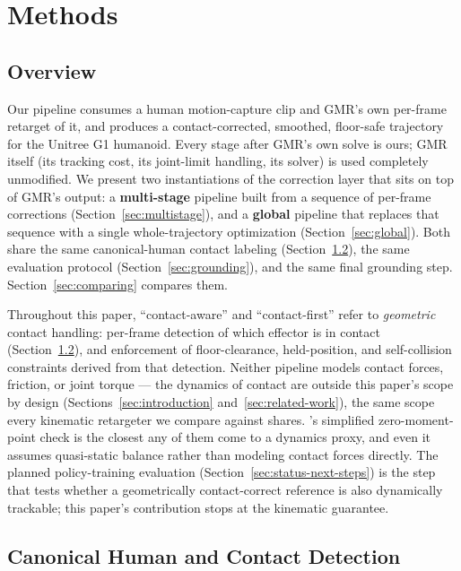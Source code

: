 \section{Methods}
\label{sec:methods}

\subsection{Overview}
\label{sec:overview}

Our pipeline consumes a human motion-capture clip and GMR's own per-frame
retarget of it, and produces a contact-corrected, smoothed, floor-safe
trajectory for the Unitree G1 humanoid. Every stage after GMR's own solve is
ours; GMR itself (its tracking cost, its joint-limit handling, its solver)
is used completely unmodified. We present two instantiations of the
correction layer that sits on top of GMR's output: a \textbf{multi-stage}
pipeline built from a sequence of per-frame corrections
(Section~\ref{sec:multistage}), and a \textbf{global} pipeline that replaces
that sequence with a single whole-trajectory optimization
(Section~\ref{sec:global}). Both share the same canonical-human contact
labeling (Section~\ref{sec:canonical}), the same evaluation protocol
(Section~\ref{sec:grounding}), and the same final grounding step.
Section~\ref{sec:comparing} compares them.

Throughout this paper, ``contact-aware'' and ``contact-first'' refer to
\textit{geometric} contact handling: per-frame detection of which effector
is in contact (Section~\ref{sec:canonical}), and enforcement of
floor-clearance, held-position, and self-collision constraints derived from
that detection. Neither pipeline models contact forces, friction, or joint
torque --- the dynamics of contact are outside this paper's scope by design
(Sections~\ref{sec:introduction} and~\ref{sec:related-work}), the same
scope every kinematic retargeter we compare against shares.
\cite{ayusawa2017morphing}'s simplified zero-moment-point check is the
closest any of them come to a dynamics proxy, and even it assumes
quasi-static balance rather than modeling contact forces directly. The
planned policy-training evaluation (Section~\ref{sec:status-next-steps}) is
the step that tests whether a geometrically contact-correct reference is
also dynamically trackable; this paper's contribution stops at the
kinematic guarantee.

\subsection{Canonical Human and Contact Detection}
\label{sec:canonical}

